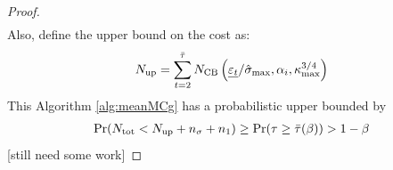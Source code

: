 \documentclass{iitthesis}
\theoremstyle{definition}
\begin{document}
\begin{proof}
\begin{align}
\end{align}
Also, define the upper bound on the cost as:
$$N_{\operatorname{up}} = \sum_{t=2}^{\bar{\tau}} N_{\text{CB}}\left(\underline{\varepsilon_t} /\hat{\sigma}_{\max},\alpha_i,\kappa_{\max}^{3/4}\right)$$
This Algorithm \ref{alg:meanMCg} has a probabilistic upper bounded by
\begin{align}
\Pr(N_{\text{tot}} < N_{\operatorname{up}}+n_\sigma+n_1) \geq \Pr(\tau \geq \bar{\tau}(\beta))>1-\beta
\end{align}
[still need some work]
\end{proof}

\label{sec:cubmcgalg}
\end{document}
